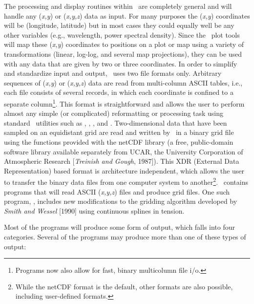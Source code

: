 The processing and display routines within \GMT\ are completely general
and will handle any ({\it x,y}) or ({\it x,y,z}) data as input.
For many purposes the ({\it x,y}) coordinates will be (longitude,
latitude) but in most cases they could equally well be any other
variables (e.g., wavelength, power spectral density).  Since the \GMT\
plot tools will map these ({\it x,y}) coordinates to positions on a
plot or map using a variety of transformations (linear, log-log, and
several map projections), they can be used with any data that are
given by two or three coordinates.  In order to simplify and standardize
input and output, \GMT\ uses two file formats only.  Arbitrary sequences
of ({\it x,y}) or ({\it x,y,z}) data are read from multi-column ASCII
tables, i.e., each file consists of several records, in which each
coordinate is confined to a separate column\footnote{Programs now also
allow for fast, binary multicolumn file i/o.}.  This format is
straightforward and allows the user to perform almost any simple
(or complicated) reformatting or processing task using standard
\UNIX\ utilities such as , , ,
\progname{sed} and \progname{awk}.
Two-dimensional data that have been sampled on an equidistant grid are
read and written by \GMT\ in a binary grid file using the functions
provided with the netCDF\index{netCDF} library (a free, public-domain software
library available separately from UCAR, the University Corporation
of Atmospheric Research [{\it Treinish and Gough}, 1987]).  This XDR
(External Data Representation) based format is architecture independent,
which allows the user to transfer the binary data files from one
computer system to another\footnote{While the netCDF format is the default,
other formats are also possible, including user-defined formats.}.
\GMT\ contains programs that will read ASCII
({\it x,y,z}) files and produce grid files.  One such program,
, includes new modifications to the gridding algorithm
developed by {\it Smith and Wessel} [1990] using continuous splines
in tension. 

Most of the programs will produce some form of output, which falls
into four categories.  Several of the programs may produce more than
one of these types of output:\par 

